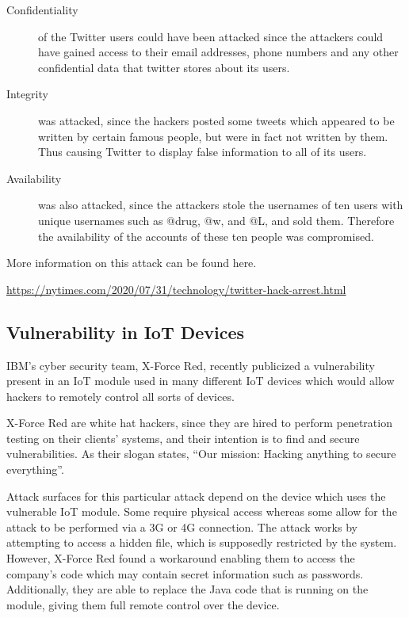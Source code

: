 \documentclass{article}
\begin{document}
\begin{description}
	\item[Confidentiality] of the Twitter users could have been attacked since the attackers could have gained access to their email addresses, phone numbers and any other confidential data that twitter stores about its users.

	\item[Integrity] was attacked, since the hackers posted some tweets which appeared to be written by certain famous people, but were in fact not written by them. Thus causing Twitter to display false information to all of its users.

	\item[Availability] was also attacked, since the attackers stole the usernames of ten users with unique usernames such as @drug, @w, and @L, and sold them. Therefore the availability of the accounts of these ten people was compromised.
\end{description}

More information on this attack can be found here.

\url{https://nytimes.com/2020/07/31/technology/twitter-hack-arrest.html}

\subsection{Vulnerability in IoT Devices}

IBM's cyber security team, X-Force Red, recently publicized a vulnerability present in an IoT module used in many different IoT devices which would allow hackers to remotely control all sorts of devices.

X-Force Red are white hat hackers, since they are hired to perform penetration testing on their clients' systems, and their intention is to find and secure vulnerabilities. As their slogan states, ``Our mission: Hacking anything to secure everything''.

Attack surfaces for this particular attack depend on the device which uses the vulnerable IoT module. Some require physical access whereas some allow for the attack to be performed via a 3G or 4G connection. The attack works by attempting to access a hidden file, which is supposedly restricted by the system. However, X-Force Red found a workaround enabling them to access the company's code which may contain secret information such as passwords. Additionally, they are able to replace the Java code that is running on the module, giving them full remote control over the device.
\end{document}
